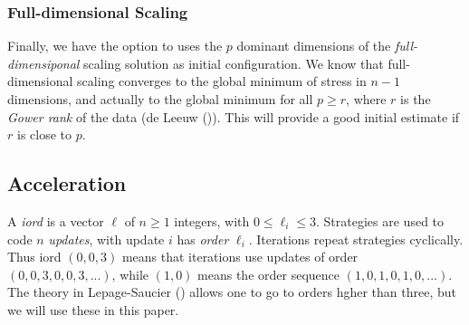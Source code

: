 \documentclass[
  12pt,
  letterpaper,
  DIV=11,
  numbers=noendperiod]{scrartcl}
\begin{document}
\subsubsection{Full-dimensional Scaling}\label{full-dimensional-scaling}

Finally, we have the option to uses the \(p\) dominant dimensions of the
\emph{full-dimensiponal} scaling solution as initial configuration. We
know that full-dimensional scaling converges to the global minimum of
stress in \(n - 1\) dimensions, and actually to the global minimum for
all \(p \geq r\), where \(r\) is the \emph{Gower rank} of the data ({de
Leeuw} ()). This will provide a good
initial estimate if \(r\) is close to \(p\).

\subsection{Acceleration}\label{acceleration}

A \emph{iord} is a vector \(\ell\) of \(n \geq 1\) integers, with
\(0 \leq \ell_i \leq 3\). Strategies are used to code \(n\)
\emph{updates}, with update \(i\) has \emph{order} \(\ell_i\).
Iterations repeat strategies cyclically. Thus iord \((0,0,3)\) means
that iterations use updates of order \((0,0,3,0,0,3,...)\), while
\((1,0)\) means the order sequence \((1,0,1,0,1,0,...)\). The theory in
Lepage-Saucier () allows one to go
to orders hgher than three, but we will use these in this paper.
\end{document}
